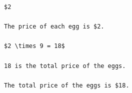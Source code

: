 \documentclass{article} %
\begin{document}
\begin{lstlisting}
$2                                                                                                                                                                                                                                   
                                                                                                                                                                                                                                     
The price of each egg is $2.                                                                                                                                                                                                         
                                                                                                                                                                                                                                     
$2 \times 9 = 18$                                                                                                                                                                                                                    
                                                                                                                                                                                                                                     
18 is the total price of the eggs.                                                                                                                                                                                                   
                                                                                                                                                                                                                                     
The total price of the eggs is $18.                                                                                                                                                                                                 
\end{lstlisting}
\end{document}
